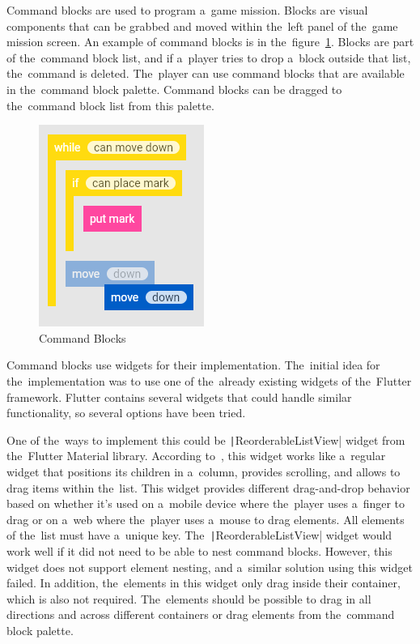Command blocks are used to program a~game mission.
Blocks are visual components that can be grabbed and moved within the~left panel of the~game mission screen.
An example of command blocks is in the~figure~\ref{fig:commandblocks}.
Blocks are part of the~command block list, and if a~player tries to drop a~block outside that list, the~command is deleted.
The~player can use command blocks that are available in the~command block palette.
Command blocks can be dragged to the~command block list from this palette.

\begin{figure}
    \centering
    \includegraphics[width=0.4\linewidth]{assets/implementation/commandblocks.png}
    \caption{Command Blocks}
    \label{fig:commandblocks}
\end{figure}

Command blocks use widgets for their implementation.
The~initial idea for the~implementation was to use one of the~already existing widgets of the~Flutter framework.
Flutter contains several widgets that could handle similar functionality, so several options have been tried.

One of the~ways to implement this could be \texttt|ReorderableListView| widget from the~Flutter Material library.
According to~\cite{a2022_material}, this widget works like a~regular widget that positions its children in a~column, provides scrolling, and allows to drag items within the~list.
This widget provides different drag-and-drop behavior based on whether it's used on a~mobile device where the~player uses a~finger to drag or on a~web where the~player uses a~mouse to drag elements.
All elements of the~list must have a~unique key.
The~\texttt|ReorderableListView| widget would work well if it did not need to be able to nest command blocks.
However, this widget does not support element nesting, and a~similar solution using this widget failed.
In addition, the~elements in this widget only drag inside their container, which is also not required.
The~elements should be possible to drag in all directions and across different containers or drag elements from the~command block palette.

